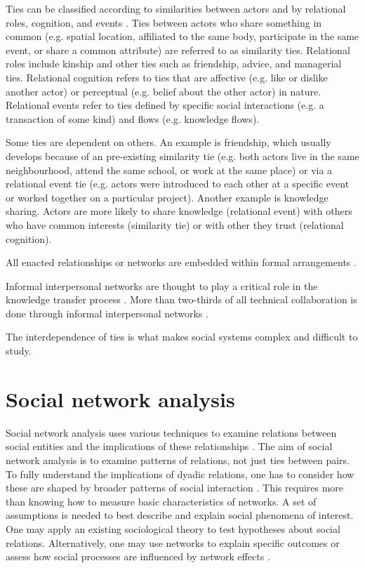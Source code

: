 Ties can be classified according to similarities between actors and by relational roles, cognition, and events \citep{borgatti2013analyzing}. Ties between actors who share something in common (e.g. spatial location, affiliated to the same body, participate in the same event, or share a common attribute) are referred to as similarity ties. Relational roles include kinship and other ties such as friendship, advice, and managerial ties. Relational cognition refers to ties that are affective (e.g. like or dislike another actor) or perceptual (e.g. belief about the other actor) in nature. Relational events refer to ties defined by specific social interactions (e.g. a transaction of some kind) and flows (e.g. knowledge flows).\medskip

Some ties are dependent on others. An example is friendship, which usually develops because of an pre-existing similarity tie (e.g. both actors live in the same neighbourhood, attend the same school, or work at the same place) or via a relational event tie (e.g. actors were introduced to each other at a specific event or worked together on a particular project). Another example is knowledge sharing. Actors are more likely to share  knowledge (relational event) with others who have common interests (similarity tie) or with other they trust (relational cognition).  


All enacted relationships or networks are embedded within formal arrangements \citep{kadushin2012understanding}.

 Informal interpersonal networks are thought to play a critical role in the knowledge transfer process \citep{reagans2003network}. More than two-thirds of all technical collaboration is done through informal interpersonal networks \citep{selnes2003promoting}. 



The interdependence of ties is what makes social systems complex and difficult to study.\medskip   
 

\section{Social network analysis}


Social network analysis uses various techniques to examine relations between social entities and the implications of these relationships \citep{wasserman1994social}. The aim of social network analysis is to examine patterns of relations, not just ties between pairs. To fully understand the implications of dyadic relations, one has to consider how these are shaped by broader patterns of social interaction \citep{scott2011sage}. This requires more than knowing how to measure basic characteristics of networks. A set of assumptions is needed to best describe and explain social phenomena of interest. One may apply an existing sociological theory to test hypotheses about social relations. Alternatively, one may use networks to explain specific outcomes or assess how social processes are influenced by network effects \citep{scott2011sage,borgatti2013analyzing}.\medskip
 

